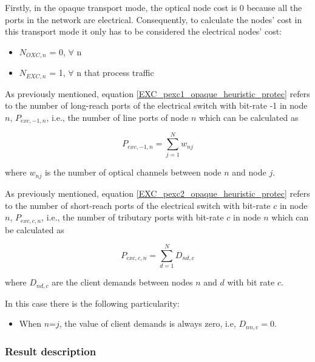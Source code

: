 Firstly, in the opaque transport mode, the optical node cost is 0 because all the ports in the network are electrical. Consequently, to calculate the nodes' cost in this transport mode it only has to be considered the electrical nodes' cost:

\begin{itemize}
  \item $N_{OXC,n}$ = 0, \quad $\forall$ n
  \item $N_{EXC,n}$ = 1, \quad $\forall$ n that process traffic
\end{itemize}

As previously mentioned, equation \ref{EXC_pexc1_opaque_heuristic_protec} refers to the number of long-reach ports of the electrical switch with bit-rate -1 in node $n$, $P_{exc,-1,n}$, i.e., the number of line ports of node $n$ which can be calculated as

\begin{equation}
P_{exc,-1,n} = \sum_{j=1}^{N} w_{nj}
\label{EXC_pexc1_opaque_heuristic_protec}
\end{equation}

\vspace{11pt}
where $w_{nj}$ is the number of optical channels between node $n$ and node $j$.

\newpage
\vspace{11pt}
As previously mentioned, equation \ref{EXC_pexc2_opaque_heuristic_protec} refers to the number of short-reach ports of the electrical switch with bit-rate $c$ in node $n$, $P_{exc,c,n}$, i.e., the number of tributary ports with bit-rate $c$ in node $n$ which can be calculated as

\begin{equation}
P_{exc,c,n} = \sum_{d=1}^{N} D_{nd,c}
\label{EXC_pexc2_opaque_heuristic_protec}
\end{equation}

\vspace{11pt}
where $D_{nd,c}$ are the client demands between nodes $n$ and $d$ with bit rate $c$.

\vspace{11pt}
In this case there is the following particularity:

\begin{itemize}
  \item When $n$=$j$, the value of client demands is always zero, i.e, $D_{nn,c}=0$.
\end{itemize}

\subsubsection{Result description}

